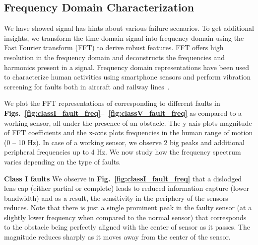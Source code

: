 \subsection{Frequency Domain Characterization} \label{subsec:freq_char} %
We have showed \aout signal has hints about various failure scenarios. %
To get additional insights, we transform the time domain \aout signal into frequency domain using the Fast Fourier transform (FFT) to derive robust features. FFT offers high resolution in the frequency domain and deconstructs the frequencies and harmonics present in a signal. Frequency domain representations have been used to characterize human activities using smartphone sensors and perform vibration screening for faults both in aircraft and railway lines~\cite{anguita2013public, HanlyWhy}. 

We plot the FFT representations of \aout corresponding to different faults in {\bfseries Figs.~\ref{fig:classI_fault_freq}--~\ref{fig:classV_fault_freq}} as compared to a working sensor, all under the presence of an obstacle. The y-axis plots magnitude of FFT coefficients and the x-axis plots frequencies in the human range of motion (0 -- 10 Hz). In case of a working sensor, we observe 2 big peaks and additional peripheral frequencies up to 4 Hz. We now study how the frequency spectrum varies depending on the type of faults.


\textbf{Class I faults}  %
We observe in \textbf{Fig.~\ref{fig:classI_fault_freq}} that a dislodged lens cap (either partial or complete) leads to reduced information capture (lower bandwidth) and as a result, the sensitivity in the periphery of the sensors reduces. Note that there is just a single prominent peak in the faulty sensor (at a slightly lower frequency when compared to the normal sensor) that corresponds to the obstacle being perfectly aligned with the center of sensor as it passes. The magnitude reduces sharply as it moves away from the center of the sensor. %

